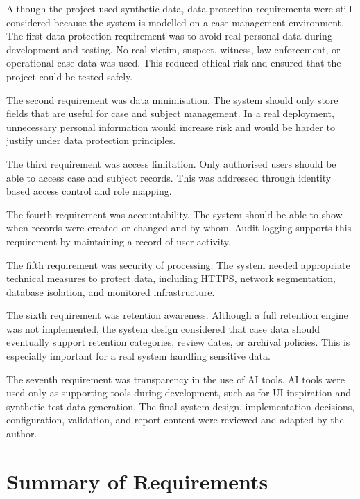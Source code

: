 Although the project used synthetic data, data protection requirements were still considered because the system is modelled on a case management environment. The first data protection requirement was to avoid real personal data during development and testing. No real victim, suspect, witness, law enforcement, or operational case data was used. This reduced ethical risk and ensured that the project could be tested safely.

The second requirement was data minimisation. The system should only store fields that are useful for case and subject management. In a real deployment, unnecessary personal information would increase risk and would be harder to justify under data protection principles.

The third requirement was access limitation. Only authorised users should be able to access case and subject records. This was addressed through identity based access control and role mapping.

The fourth requirement was accountability. The system should be able to show when records were created or changed and by whom. Audit logging supports this requirement by maintaining a record of user activity.

The fifth requirement was security of processing. The system needed appropriate technical measures to protect data, including HTTPS, network segmentation, database isolation, and monitored infrastructure.

The sixth requirement was retention awareness. Although a full retention engine was not implemented, the system design considered that case data should eventually support retention categories, review dates, or archival policies. This is especially important for a real system handling sensitive data.

The seventh requirement was transparency in the use of AI tools. AI tools were used only as supporting tools during development, such as for UI inspiration and synthetic test data generation. The final system design, implementation decisions, configuration, validation, and report content were reviewed and adapted by the author.


\section{Summary of Requirements}

